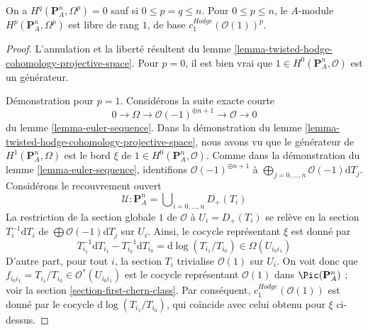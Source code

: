 \begin{lemma}
\label{lemma-hodge-cohomology-projective-space}
On a $H^q(\mathbf{P}^n_A, \Omega^p) = 0$
sauf si $0 \leq p = q \leq n$. Pour $0 \leq p \leq n$, le $A$-module
$H^p(\mathbf{P}^n_A, \Omega^p)$ est libre de rang $1$, de base
$c_1^{Hodge}(\mathcal{O}(1))^p$.
\end{lemma}

\begin{proof}
L'annulation et la liberté résultent du
lemme \ref{lemma-twisted-hodge-cohomology-projective-space}.
Pour $p = 0$, il est bien vrai que
$1 \in H^0(\mathbf{P}^n_A, \mathcal{O})$ est un générateur.

\medskip\noindent
Démonstration pour $p = 1$. Considérons la suite exacte courte
$$
0 \to \Omega \to \mathcal{O}(-1)^{\oplus n + 1} \to \mathcal{O} \to 0
$$
du lemme \ref{lemma-euler-sequence}. Dans la démonstration du
lemme \ref{lemma-twisted-hodge-cohomology-projective-space},
nous avons vu que le générateur de $H^1(\mathbf{P}^n_A, \Omega)$
est le bord $\xi$ de $1 \in H^0(\mathbf{P}^n_A, \mathcal{O})$.
Comme dans la démonstration du lemme \ref{lemma-euler-sequence}, identifions
$\mathcal{O}(-1)^{\oplus n + 1}$ à
$\bigoplus_{j = 0, \ldots, n} \mathcal{O}(-1)\text{d}T_j$.
Considérons le recouvrement ouvert
$$
\mathcal{U} : 
\mathbf{P}^n_A =
\bigcup\nolimits_{i = 0, \ldots, n} D_{+}(T_i)
$$
La restriction de la section globale $1$ de $\mathcal{O}$
à $U_i = D_+(T_i)$ se relève en la section $T_i^{-1} \text{d}T_i$ de
$\bigoplus \mathcal{O}(-1)\text{d}T_j$ sur $U_i$. Ainsi, le cocycle
représentant $\xi$ est donné par
$$
T_{i_1}^{-1} \text{d}T_{i_1} - T_{i_0}^{-1} \text{d}T_{i_0} =
\text{d}\log(T_{i_1}/T_{i_0}) \in \Omega(U_{i_0i_1})
$$
D'autre part, pour tout $i$, la section $T_i$ trivialise
$\mathcal{O}(1)$ sur $U_i$. On voit donc que
$f_{i_0i_1} = T_{i_1}/T_{i_0} \in \mathcal{O}^*(U_{i_0i_1})$
est le cocycle représentant $\mathcal{O}(1)$ dans $\Pic(\mathbf{P}^n_A)$ ;
voir la section \ref{section-first-chern-class}.
Par conséquent, $c_1^{Hodge}(\mathcal{O}(1))$
est donné par le cocycle $\text{d}\log(T_{i_1}/T_{i_0})$,
qui coïncide avec celui obtenu pour $\xi$ ci-dessus.


\end{proof}
